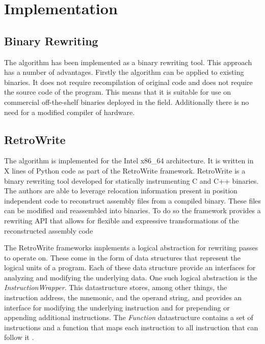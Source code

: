 \chapter{Implementation}

\section{Binary Rewriting}
The algorithm has been implemented as a binary rewriting tool. 
This approach has a number of advantages. 
Firstly the algorithm can be applied to existing binaries. It does not require recompilation of original code and does not require the source code of the program. 
This means that it is suitable for use on commercial off-the-shelf binaries deployed in the field. 
Additionally there is no need for a modified compiler of hardware. 




\section{RetroWrite}
The algorithm is implemented for the Intel x86\_64 architecture. It is written in X lines of Python code as part of the RetroWrite framework. 
RetroWrite is a binary rewriting tool developed for statically instrumenting C and C++ binaries. 
The authors are able to leverage relocation information present in position independent code to reconstruct assembly files from a compiled binary. 
These files can be modified and reassembled into binaries. 
To do so the framework provides a rewriting API that allows for flexible and expressive transformations of the reconstructed assembly code \cite{Dinesh2020RetroWriteSI}

The RetroWrite frameworks implements a logical abstraction for rewriting passes to operate on.
These come in the form of data structures that represent the logical units of a program.
Each of these data structure provide an interfaces for analyzing and modifying the underlying data. 
One such logical abstraction is the \textit{InstructionWrapper}. 
This datastructure stores, among other things, the instruction address, the mnemonic, and the operand string, and provides an interface
for modifying the underlying instruction and for prepending or appending additional instructions.  
The \textit{Function} datastructure contains a set of instructions and a function that maps each instruction to all instruction that can follow it \cite{Dinesh2020RetroWriteSI,  hexhive}. 

